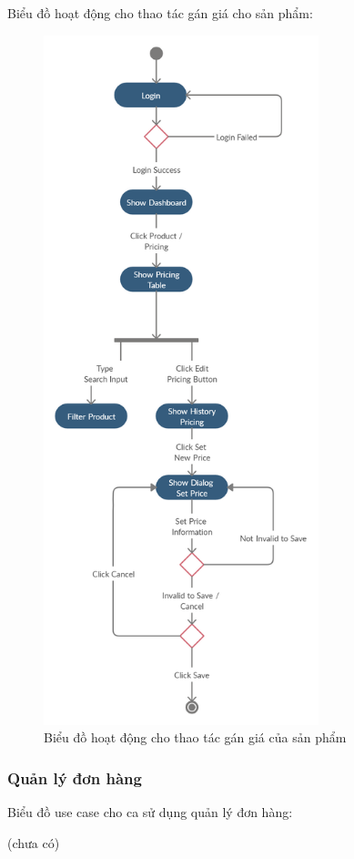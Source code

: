 Biểu đồ hoạt động cho thao tác gán giá cho sản phẩm:
\begin{figure}[H]
\centering
\includegraphics[width=8cm]{images/activity-diagram/set-price.png}
\caption{Biểu đồ hoạt động cho thao tác gán giá của sản phẩm}
\end{figure}

\subsubsection{Quản lý đơn hàng}
Biểu đồ use case cho ca sử dụng quản lý đơn hàng:

(chưa có)

